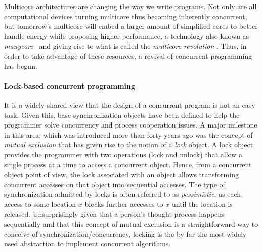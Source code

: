 \documentclass[runningheads,a4paper]{article}
\begin{document}
 


Multicore architectures are changing the way we write programs.
Not only are all computational devices
turning multicore thus becoming inherently concurrent, 
but tomorrow's multicore will embed a larger amount of simplified cores to better handle energy while 
proposing higher performance, a technology also known as \emph{manycore}~\cite{Borkar2007}
and giving rise to what is called the {\it multicore  
revolution} \cite{HL08}.
Thus, in order to take advantage of these resources, a revival of concurrent programming has begun.


\paragraph{Lock-based concurrent programming}
%
It is a widely shared view  that the design of a concurrent program is not an easy
task.
Given this, base synchronization objects have been defined to help 
the programmer solve  concurrency and process cooperation  issues. 
A  major milestone in this area, which was introduced 
more than forty years  ago was the concept of {\it mutual exclusion} \cite{D68}
that has given rise  to  the  notion of  a  {\it  lock} object.    
A lock object provides the programmer with two operations (lock and unlock)
that  allow a single process at a time to access a concurrent object. 
Hence, from a  concurrent object point of view,   the  lock associated with
an object allows transforming  concurrent  accesses on  that object  
into sequential accesses.
The type of synchronization admitted by locks is often referred to as \emph{pessimistic}, 
as each access to some location $x$ blocks further accesses to $x$ until the location is released.
Unsurprisingly given that
a person's thought process happens sequentially
and that this concept of mutual exclusion is a straightforward way to
conceive of synchronization/concurrency,
locking is the by far the most widely used abstraction to
implement concurrent algorithms.
\end{document}
